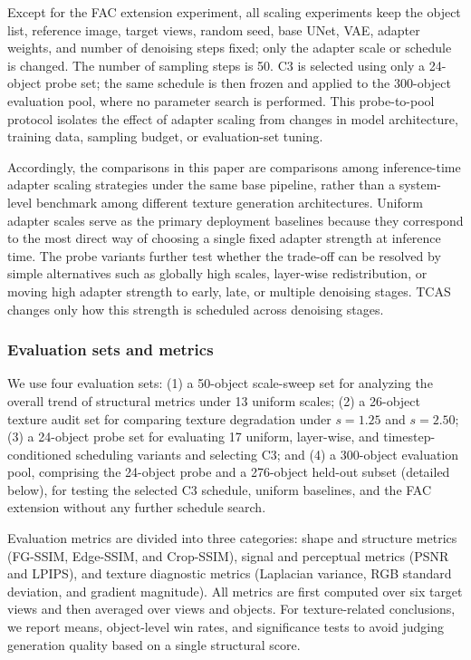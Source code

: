 \documentclass[times,twocolumn,final]{elsarticle}
\providecommand{\DIFadd}[1]{{\protect\color{blue} \sf #1}} %
\providecommand{\DIFaddbegin}{} %
\providecommand{\DIFaddend}{} %
\newcommand{\DIFaddincludegraphics}[2][]{{\color{blue}\fbox{\DIFOincludegraphics[#1]{#2}}}} %
\DeclareRobustCommand{\DIFaddbegin}{\DIFOaddbegin \let\includegraphics\DIFaddincludegraphics} %
\DeclareRobustCommand{\DIFaddend}{\DIFOaddend \let\includegraphics\DIFOincludegraphics} %
\begin{document}
Except for the FAC extension experiment, all scaling experiments keep the object list, reference image, target views, random seed, base UNet, VAE, adapter weights, and number of denoising steps fixed; only the adapter scale or schedule is changed. The number of sampling steps is 50. C3 is selected using only a 24-object probe set; the same schedule is then frozen and applied to the 300-object   \DIFaddbegin \DIFadd{evaluation pool}\DIFaddend , where no parameter search is performed. This   \DIFaddbegin \DIFadd{probe-to-pool }\DIFaddend protocol isolates the effect of adapter scaling from changes in model architecture, training data, sampling budget, or   \DIFaddbegin \DIFadd{evaluation-set }\DIFaddend tuning.

Accordingly, the comparisons in this paper are comparisons among inference-time adapter scaling strategies under the same base pipeline, rather than a system-level benchmark among different texture generation architectures. Uniform adapter scales serve as the primary deployment baselines because they correspond to the most direct way of choosing a single fixed adapter strength at inference time. The probe variants further test whether the trade-off can be resolved by simple alternatives such as globally high scales, layer-wise redistribution, or moving high adapter strength to early, late, or multiple denoising stages. TCAS changes only how this strength is scheduled across denoising stages.

\DIFaddbegin \subsubsection{\DIFadd{Evaluation sets and metrics}}

\DIFaddend We use four evaluation sets: (1) a 50-object scale-sweep set for analyzing the overall trend of structural metrics under 13 uniform scales; (2) a 26-object texture audit set for comparing texture degradation under $s = 1.25$   and $s = 2.50$; (3) a 24-object probe set for evaluating 17 uniform, layer-wise, and timestep-conditioned scheduling variants and selecting C3; and (4) a 300-object   \DIFaddbegin \DIFadd{evaluation pool, comprising the 24-object probe and a 276-object held-out subset (detailed below), }\DIFaddend for testing the selected C3 schedule, uniform baselines, and the FAC extension without   \DIFaddbegin \DIFadd{any further schedule search}\DIFaddend .

Evaluation metrics are divided into three categories: shape and structure metrics (FG-SSIM, Edge-SSIM, and Crop-SSIM), signal and perceptual metrics (PSNR and LPIPS), and texture diagnostic metrics (Laplacian variance, RGB standard deviation, and gradient magnitude). All metrics are first computed over six target views and then averaged over views and objects. For texture-related conclusions, we report means, object-level win rates, and significance tests to avoid judging generation quality based on a single structural score.
\end{document}
